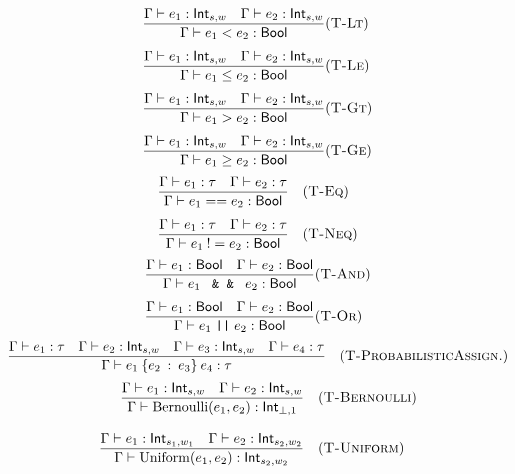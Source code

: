 \[
  \begin{aligned}
    \frac{\Gamma \vdash e_1 : \mathsf{Int}_{s,w}
      \quad
      \Gamma \vdash e_2 : \mathsf{Int}_{s,w}}
    {\Gamma \vdash e_1 < e_2   : \mathsf{Bool}}
     & (\textsc{T-Lt}) \\[1ex]
    \frac{\Gamma \vdash e_1 : \mathsf{Int}_{s,w}
      \quad
      \Gamma \vdash e_2 : \mathsf{Int}_{s,w}}
    {\Gamma \vdash e_1 \le e_2 : \mathsf{Bool}}
     & (\textsc{T-Le}) \\[1ex]
    \frac{\Gamma \vdash e_1 : \mathsf{Int}_{s,w}
      \quad
      \Gamma \vdash e_2 : \mathsf{Int}_{s,w}}
    {\Gamma \vdash e_1 > e_2   : \mathsf{Bool}}
     & (\textsc{T-Gt}) \\[1ex]
    \frac{\Gamma \vdash e_1 : \mathsf{Int}_{s,w}
      \quad
      \Gamma \vdash e_2 : \mathsf{Int}_{s,w}}
    {\Gamma \vdash e_1 \ge e_2 : \mathsf{Bool}}
     & (\textsc{T-Ge})
  \end{aligned}
\]
\[
  \begin{aligned}
    \frac{\Gamma \vdash e_1 : \tau
      \quad
      \Gamma \vdash e_2 : \tau}
    {\Gamma \vdash e_1 == e_2 : \mathsf{Bool}}
     & \quad(\textsc{T-Eq})  \\[1ex]
    \frac{\Gamma \vdash e_1 : \tau
      \quad
      \Gamma \vdash e_2 : \tau}
    {\Gamma \vdash e_1 \:!= e_2 : \mathsf{Bool}}
     & \quad(\textsc{T-Neq})
  \end{aligned}
\]
\[
  \begin{aligned}
    \frac{\Gamma \vdash e_1 : \mathsf{Bool}
      \quad
      \Gamma \vdash e_2 : \mathsf{Bool}}
    {\Gamma \vdash e_1 \;\code{ &                  & }\; e_2 : \mathsf{Bool}}
                                & (\textsc{T-And})                            \\[1ex]
    \frac{\Gamma \vdash e_1 : \mathsf{Bool}
      \quad
      \Gamma \vdash e_2 : \mathsf{Bool}}
    {\Gamma \vdash e_1 \;\texttt{||}\; e_2 : \mathsf{Bool}}
                                & (\textsc{T-Or})
  \end{aligned}
\]
\[
  \frac{\Gamma \vdash e_1 : \tau
    \quad
    \Gamma \vdash e_2 : \mathsf{Int}_{s,w}
    \quad
    \Gamma \vdash e_3 : \mathsf{Int}_{s,w}
    \quad
    \Gamma \vdash e_4 : \tau
  }
  {\Gamma \vdash e_1 \:\{e_2 \::\: e_3\}\: e_4 : \tau} \quad(\textsc{T-ProbabilisticAssign.})
\]
\[
  \begin{aligned}
    \frac{\Gamma \vdash e_1 : \mathsf{Int}_{s, w}
      \quad
      \Gamma \vdash e_2 : \mathsf{Int}_{s,w}}
    {\Gamma \vdash \mathrm{Bernoulli}(e_1,e_2) : \mathsf{Int}_{\bot,1}}
     & \quad(\textsc{T-Bernoulli}) \\[2ex]
    \frac{\Gamma \vdash e_1 : \mathsf{Int}_{s_1,w_1}
      \quad
      \Gamma \vdash e_2 : \mathsf{Int}_{s_2,w_2}}
    {\Gamma \vdash \mathrm{Uniform}(e_1,e_2) : \mathsf{Int}_{s_2,w_2}}
     & \quad(\textsc{T-Uniform})
  \end{aligned}
\]

